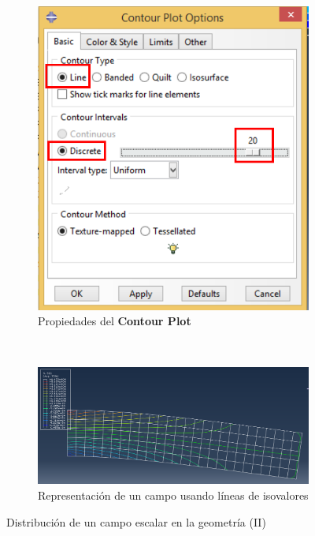 \begin{enumerate}
\begin{figure}[H]
\begin{subfigure}{0.35\textwidth}
      \includegraphics[width=\textwidth]{./body/images/imagen80.pdf}
      \caption{Propiedades del \textbf{Contour Plot}}
      \label{figu80}
    \end{subfigure}%
    ~ %
    \begin{subfigure}{0.44\textwidth}
      \includegraphics[width=\textwidth]{./body/images/imagen81}
      \caption{Representación de un campo usando líneas de isovalores}
      \label{figu81}
    \end{subfigure}%
    \caption{Distribución de un campo escalar en la geometría (II)}
  \end{figure}


\end{enumerate}
